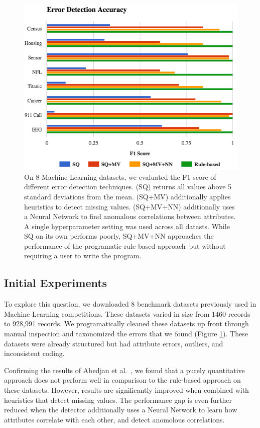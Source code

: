 \iffalse
\begin{figure}[t]
\centering
 \includegraphics[width=\columnwidth]{figures/exp1-bar.png}
 \caption{On 8 Machine Learning datasets, we evaluated the F1 score of different error detection techniques. (SQ) returns all values above 5 standard deviations from the mean. (SQ+MV) additionally applies heuristics to detect missing values. (SQ+MV+NN) additionally uses a Neural Network to find anomalous correlations between attributes. A single hyperparameter setting was used across all datasts. While SQ on its own performs poorly, SQ+MV+NN approaches the performance of the programatic rule-based approach--but without requiring a user to write the program.
 \label{fig:error}}
\end{figure}

\subsection{Initial Experiments}
To explore this question, we downloaded 8 benchmark datasets previously used in Machine Learning competitions. These datasets varied in size from 1460 records to 928,991 records.
We programatically cleaned these datasets up front through manual inspection and taxonomized the errors that we found (Figure \ref{fig:error}).
These datasets were already structured but had attribute errors, outliers, and inconsistent coding.

Confirming the results of Abedjan et al.~\cite{DBLP:journals/pvldb/AbedjanCDFIOPST16}, we found that a 
purely quantitative approach does not perform well in comparison to the rule-based approach on these datasets.
However, results are significantly improved when combined with heuristics that detect missing values. 
The performance gap is even further reduced when the detector additionally uses a Neural Network to learn how attributes correlate with each other, and detect anomolous correlations.


